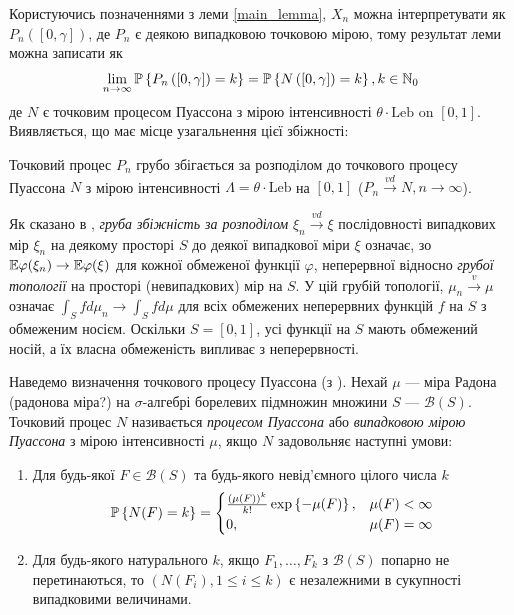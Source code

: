Користуючись позначеннями з леми \ref{main_lemma}, $X_n$ можна інтерпретувати як
$P_n\left([0, \gamma] \right)$, де $P_n$ 
є деякою випадковою точковою мірою, тому результат леми можна записати як 
\begin{gather*}
    \lim_{n\to\infty} \P{P_n\left([0, \gamma] \right) = k} = \P{N\left([0, \gamma] \right) = k}, k\in\N_0
\end{gather*}
де $N$ є точковим процесом Пуассона
з {\color{red}мірою інтенсивності} $\theta \cdot \mathrm{Leb}$ on $[0, 1]$. 
Виявляється, що має місце узагальнення цієї збіжності:
\begin{theorem}\label{main_th}
    Точковий процес $P_n$ {\color{red}грубо збігається за розподілом} 
    до точкового процесу Пуассона $N$
    з мірою інтенсивності $\Lambda = \theta \cdot \mathrm{Leb}$ на $[0, 1]$ 
    ($P_n \overset{vd}{\longrightarrow} N, n\to\infty$).
\end{theorem}

Як сказано в \cite{Kallenberg_2017}, \emph{груба збіжність за розподілом} 
$\xi_n \overset{vd}{\longrightarrow} \xi$ послідовності випадкових мір $\xi_n$
на деякому просторі $S$ до деякої випадкової міри $\xi$ означає, зо
$\E \varphi(\xi_n) \to \E \varphi(\xi)$
для кожної обмеженої функції $\varphi$, неперервної відносно \emph{грубої топології} на
просторі (невипадкових) мір на $S$. У цій грубій топології, $\mu_n \overset{v}{\longrightarrow} \mu$
означає $\int_S f d\mu_n \to \int_S f d\mu$ 
для всіх обмежених неперервних функцій $f$ на $S$ з обмеженим носієм.
Оскільки $S = [0,1]$, усі функції на $S$
мають обмежений носій, а їх власна обмеженість випливає з неперервності.

Наведемо визначення точкового процесу Пуассона (з \cite{Resnick_1987}). 
Нехай $\mu$ --- {\color{red}міра Радона (радонова міра?)}
на $\sigma$-алгебрі борелевих підмножин множини $S$ --- $\mathcal{B}(S)$.
Точковий процес $N$ називається \emph{процесом Пуассона} або
\emph{випадковою мірою Пуассона} з мірою інтенсивності $\mu$, якщо $N$ 
задовольняє наступні умови:
\begin{enumerate}
    \item Для будь-якої $F \in \mathcal{B}(S)$ та будь-якого невід'ємного цілого числа $k$
    \begin{gather*}
        \P{N(F) = k} = \begin{cases}
            \frac{(\mu(F))^k}{k!} \exp\left\{-\mu(F)\right\}, & \mu(F) < \infty \\
            0, & \mu(F) = \infty
        \end{cases}
    \end{gather*}
    \item Для будь-якого натурального $k$, 
    якщо $F_1, \dots, F_k$ з $\mathcal{B}(S)$ попарно не перетинаються, то
    $\left(N(F_i), 1\leq i \leq k\right)$ є незалежними в сукупності випадковими величинами.
\end{enumerate}

